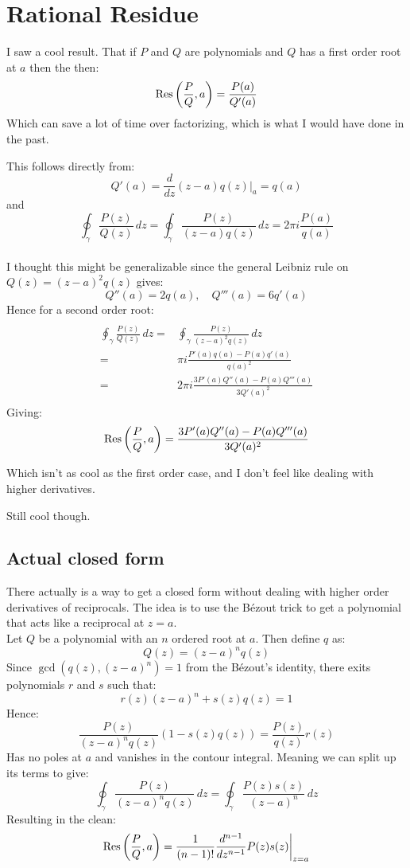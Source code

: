
\section{Rational Residue}
I saw a cool result.
That if $P$ and $Q$ are polynomials and $Q$ has a first order root at $a$ then the then:
\[\operatorname{Res}\left(\frac{P}{Q},a\right) = \frac{P(a)}{Q'(a)} \]
Which can save a lot of time over factorizing, 
which is what I would have done in the past.

This follows directly from:
\[Q'(a)=\frac{d}{dz}(z-a)q(z)\bigg|_a = q(a)\]
and
\[\oint_\gamma\frac{P(z)}{Q(z)}\,dz = \oint_\gamma \frac{P(z)}{(z-a)q(z)}\,dz = 2\pi i\frac{P(a)}{q(a)}\]
\\

I thought this might be generalizable since the general Leibniz rule on $Q(z)=(z-a)^2q(z)$ gives:
\[Q''(a)=2q(a),\quad Q'''(a)=6q'(a)\]
Hence for a second order root:
\begin{equation*}
\begin{aligned}
\end{aligned}
\end{equation*}
\begin{equation*}
\begin{aligned}
	\oint_\gamma\frac{P(z)}{Q(z)}\,dz =& \oint_\gamma \frac{P(z)}{(z-a)^2q(z)}\,dz \\
	=& \pi i\frac{P'(a)q(a)-P(a)q'(a)}{q(a)^2}\\
	=& 2\pi i\frac{3P'(a)Q''(a)-P(a)Q'''(a)}{3Q'(a)^2}\\
\end{aligned}
\end{equation*}
Giving:
\[\operatorname{Res}\left(\frac{P}{Q},a\right)= \frac{3P'(a)Q''(a)-P(a)Q'''(a)}{3Q'(a)^2} \]

Which isn't as cool as the first order case,
and I don't feel like dealing with higher derivatives.

Still cool though.

\subsection{Actual closed form}
There actually is a way to get a closed form without dealing with higher order derivatives of reciprocals.
The idea is to use the Bézout trick to get a polynomial that acts like a reciprocal at $z=a$.
\\

Let $Q$ be a polynomial with an $n$ ordered root at $a$.
Then define $q$ as:
\[Q(z) = (z-a)^nq(z)\]
Since $\gcd(q(z),(z-a)^n) = 1$ from the Bézout's identity, there exits polynomials $r$ and $s$ such that:
\[r(z)(z-a)^n+s(z)q(z)=1\]
Hence:
\[\frac{P(z)}{(z-a)^nq(z)}(1-s(z)q(z)) = \frac{P(z)}{q(z)}r(z)\]
Has no poles at $a$ and vanishes in the contour integral.
Meaning we can split up its terms to give:
\[\oint_\gamma\frac{P(z)}{(z-a)^nq(z)}\,dz = \oint_\gamma \frac{P(z)s(z)}{(z-a)^n}\,dz\]
Resulting in the clean:
\[\operatorname{Res}\left(\frac{P}{Q},a\right) = \frac{1}{(n-1)!}\frac{d^{n-1}}{dz^{n-1}}P(z)s(z)\bigg|_{z=a}\]

